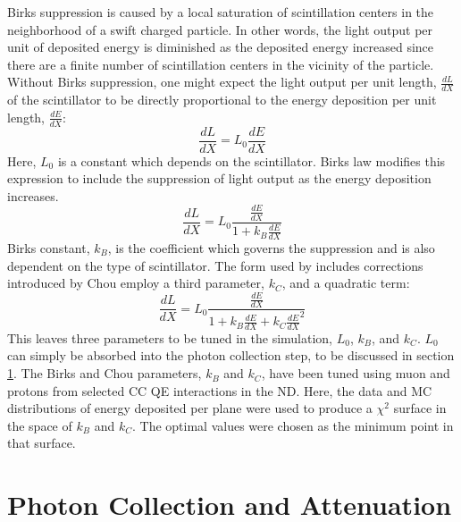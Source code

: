 Birks suppression is caused by a local saturation of scintillation centers in the neighborhood of a swift charged particle.  In other words, the light output per unit of deposited energy is diminished as the deposited energy increased since there are a finite number of scintillation centers in the vicinity of the particle.  Without Birks suppression, one might expect the light output per unit length, $\frac{dL}{dX}$ of the scintillator to be directly proportional to the energy deposition per unit length, $\frac{dE}{dX}$:
\begin{equation}
\frac{dL}{dX} = L_0  \frac{dE}{dX}
\end{equation}
Here, $L_0$ is a constant which depends on the scintillator.  Birks law modifies this expression to include the suppression of light output as the energy deposition increases.
\begin{equation}
\frac{dL}{dX} = L_0  \frac{\frac{dE}{dX}}{1+ k_B \frac{dE}{dX}}
\end{equation}
Birks constant, $k_B$, is the coefficient which governs the suppression and is also dependent on the type of scintillator.  The form used by \nova includes corrections introduced by Chou \cite{chou1952nature} employ a third parameter, $k_C$, and a quadratic term:
\begin{equation}
\frac{dL}{dX} = L_0  \frac{\frac{dE}{dX}}{1+ k_B \frac{dE}{dX} + k_C \frac{dE}{dX}^2}
\end{equation}
This leaves three parameters to be tuned in the simulation, $L_0$, $k_B$, and $k_C$.  $L_0$ can simply be absorbed into the photon collection step, to be discussed in section \ref{photoncoll}.  The Birks and Chou parameters, $k_B$ and $k_C$, have been tuned using muon and protons from selected \numu CC QE interactions in the ND.  Here, the data and MC distributions of energy deposited per plane were used to produce a $\chi^2$ surface in the space of $k_B$ and $k_C$.  The optimal values were chosen as the minimum point in that surface.


\section{Photon Collection and Attenuation}
\label{photoncoll}

